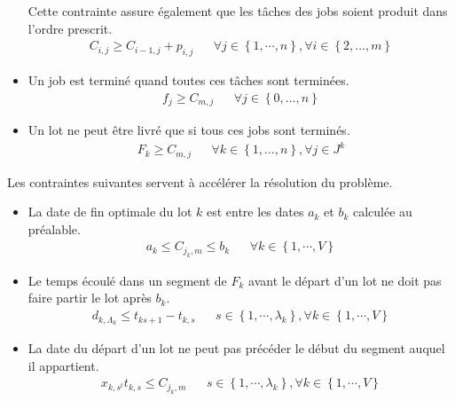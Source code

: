 \begin{itemize}
	      Cette contrainte assure également que les tâches des jobs soient produit dans l'ordre prescrit.
	      \begin{align}
		      C_{i,j}\geq C_{i-1,j}+p_{i,j} &  &
		      \forall j\in\left\{1,\cdots,n\right\},\forall i\in\left\{2,\dotsc,m\right\}
		  \end{align}
	\item 
		Un job est terminé quand toutes ces tâches sont terminées.
		\begin{align}
			f_j \geq C_{m, j} & & \forall j \in \left\{0,\dotsc,n\right\}
		\end{align}
	\item
	      Un lot ne peut être livré que si tous ces jobs sont terminés.
	      \begin{align}
		      F_k \geq C_{m, j} &  & \forall k \in \left\{1,\dotsc, n \right\}, \forall j \in J^k
	      \end{align}
\end{itemize}

Les contraintes suivantes servent à accélérer la résolution du problème.
\begin{itemize}
	\item
	      La date de fin optimale du lot $k$ est entre les dates $a_k$ et $b_k$ calculée au préalable.
	      \begin{align}
		      a_k \leq C_{j_k, m} \leq b_k &  & \forall k \in \left\{1,\cdots,V\right\}
	      \end{align}
	\item
	      Le temps écoulé dans un segment de $F_k$ avant le départ d'un lot ne doit pas faire partir le lot après $b_k$.
	      \begin{align}
		      d_{k, \Lambda_k} \leq t_{k s+1} - t_{k, s} &  & s \in \left\{1,\cdots,\lambda_k\right\}, \forall k \in \left\{1,\cdots,V\right\}
	      \end{align}
	\item
	      La date du départ d'un lot ne peut pas précéder le début du segment auquel il appartient.
	      \begin{align}
		      x_{k, s^t} t_{k, s} \leq C_{j_k, m} &  & s \in \left\{1,\cdots,\lambda_k\right\}, \forall k \in \left\{1,\cdots,V\right\}
	      \end{align}
\end{itemize}
